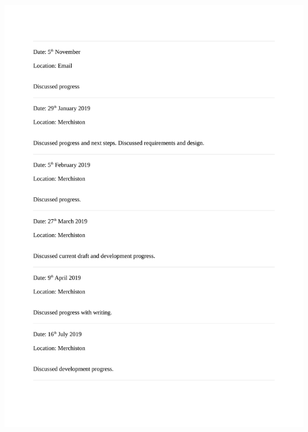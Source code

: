 \documentclass[12pt,a4paper]{article}
\begin{document}
\begin{appendices}
\includegraphics[scale=0.25]{Report/graphics/diary-2.png}
\newpage

\end{appendices}
\end{document}
